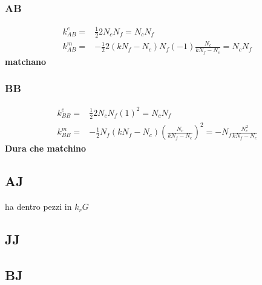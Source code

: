 \documentclass[a4paper,12pt]{article}
\begin{document}
  \subsubsection*{AB}
  \begin{align*}
   k^e_{AB} = & \frac{1}{2} 2 N_c N_f = N_c N_f \\
   k^m_{AB} = & - \frac{1}{2} 2 (k N_f - N_c) N_f ( -1) \frac{N_c}{k N_f - N_c} = N_c N_f
  \end{align*}
  \textbf{matchano}
  
  \subsubsection*{BB}
  \begin{align*}
   k^e_{BB} = & \frac{1}{2} 2 N_c N_f (1)^2 = N_c N_f \\
   k^m_{BB} = & - \frac{1}{2} N_f (k N_f - N_c) \left( \frac{N_c}{k N_f - N_c} \right)^2 = - N_f \frac{N_c^2}{k N_f - N_c}
  \end{align*}
  \textbf{Dura che matchino}
  \subsection*{AJ}
  ha dentro pezzi in $k_rG$
  \subsection*{JJ}
  
  \subsection*{BJ}
  
  
\newpage
\nocite{*}


\end{document}
